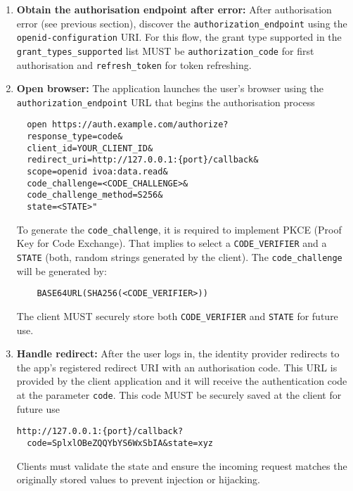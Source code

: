 \documentclass[11pt,a4paper]{ivoa}
\begin{document}
\begin{enumerate}
  \item{}\textbf{Obtain the authorisation endpoint after error:} After authorisation error (see previous section), discover the \verb|authorization_endpoint|
  using the \verb|openid-configuration| URI. For this flow, the grant type supported in the \verb|grant_types_supported| list MUST
  be \verb|authorization_code| for first authorisation and \verb|refresh_token| for token refreshing.
  \item{\textbf{Open browser:} The application launches the user’s browser using the \verb|authorization_endpoint| URL that begins the authorisation process
  \begin{verbatim}
  open https://auth.example.com/authorize?
  response_type=code&
  client_id=YOUR_CLIENT_ID&
  redirect_uri=http://127.0.0.1:{port}/callback&
  scope=openid ivoa:data.read&
  code_challenge=<CODE_CHALLENGE>&
  code_challenge_method=S256&
  state=<STATE>"
  \end{verbatim}
  To generate the \verb|code_challenge|, it is required to implement PKCE (Proof Key for Code Exchange). That implies to
  select a \verb|CODE_VERIFIER| and a \verb|STATE| (both, random strings generated by the client). The \verb|code_challenge|
  will be generated by:
  \begin{verbatim}
    BASE64URL(SHA256(<CODE_VERIFIER>))
  \end{verbatim}
  The client MUST securely store both \verb|CODE_VERIFIER| and \verb|STATE| for future use.}
\item{\textbf{Handle redirect:} After the user logs in, the identity provider redirects to the app's registered redirect
                                URI with an authorisation code. This URL is provided by the client application and it will
                                receive the authentication code at the parameter \verb|code|. This code MUST be
                                securely saved at the client for future use
\begin{verbatim}
http://127.0.0.1:{port}/callback?
  code=SplxlOBeZQQYbYS6WxSbIA&state=xyz
\end{verbatim}
Clients must validate the state and ensure the incoming request matches the originally stored values to prevent injection or hijacking.}


\end{enumerate}
\end{document}
